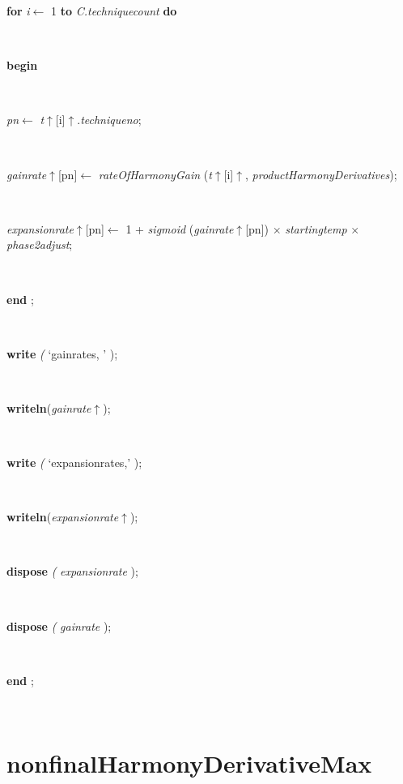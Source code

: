 \begin{tabbing}
\+\parbox{14cm}{\textsf {\textbf {for } \textsf{\textit{i}$\leftarrow$ 1} \textbf{ to } \textsf{\textit{C.techniquecount}} \textbf{ do } }}\\
\<\parbox{14cm}{\textsf{\textbf{begin} }}\\
\parbox{14cm}{\textsf{\textit{pn}$\leftarrow$ \textit{t}$\uparrow$\textit{}[i]$\uparrow$.\textit{techniqueno}}; }\\
\parbox{14cm}{\textsf{\textit{gainrate}$\uparrow$\textit{}[pn]$\leftarrow$ \textit{rateOfHarmonyGain} (\textit{t}$\uparrow$\textit{}[i]$\uparrow$\textit{}, \textit{productHarmonyDerivatives})}; }\\
\parbox{14cm}{\textsf{\textit{expansionrate}$\uparrow$\textit{}[pn]$\leftarrow$ 1 + \textit{sigmoid} (\textit{gainrate}$\uparrow$\textit{}[pn]) $\times$ \textit{startingtemp} $\times$ \textit{phase2adjust}}; }\\
\<\-\parbox{14cm}{\textsf{\textbf{end} ;}}\\
\parbox{14cm}{\textsf{\textbf{write}  \textit{(} \textrm{\textup { `gainrates, ' } });}}\\
\parbox{14cm}{\textsf{\textbf{writeln}(\textit{gainrate}$\uparrow$\textit{})}; }\\
\parbox{14cm}{\textsf{\textbf{write}  \textit{(} \textrm{\textup { `expansionrates,' } });}}\\
\parbox{14cm}{\textsf{\textbf{writeln}(\textit{expansionrate}$\uparrow$\textit{})}; }\\
\parbox{14cm}{\textsf{\textbf{dispose} \textit{(} \textit{expansionrate} );}}\\
\parbox{14cm}{\textsf{\textbf{dispose} \textit{(} \textit{gainrate} );}}\\
\<\-\parbox{14cm}{\textsf{\textbf{end} ;}}\\
\end{tabbing}
\section{nonfinalHarmonyDerivativeMax}\label{sec:harmonynonfinalHarmonyDerivativeMax}

